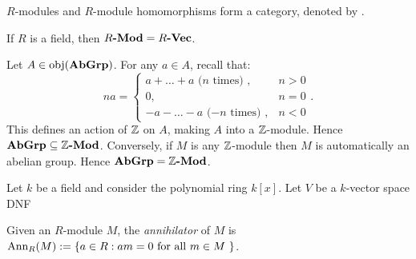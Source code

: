 \begin{definition}
	$R$-modules and $R$-module homomorphisms form a category, denoted by \emph{}.
\end{definition}

\begin{example}
	If $R$ is a field, then ${\normalfont\textbf{$R$-Mod}} = {\normalfont\textbf{$R$-Vec}}$.
\end{example}

\begin{example}
	Let $A \in \operatorname{obj}({\normalfont\textbf{AbGrp}})$. For any $a \in A$, recall that:
	\[
		na = \begin{cases} a + \ldots + a \text{ ($n$ times) }, & n > 0 \\ 0, & n =0 \\ -a - \ldots - a \text{ ($-n$ times) }, & n < 0\end{cases}.
	\]
	This defines an action of $\mathbb{Z}$ on $A$, making $A$ into a $\mathbb{Z}$-module. Hence ${\normalfont\textbf{AbGrp}} \subseteq {\normalfont\textbf{$\mathbb{Z}$-Mod}}$. Conversely, if $M$ is any $\mathbb{Z}$-module then $M$ is automatically an abelian group. Hence ${\normalfont\textbf{AbGrp}} = {\normalfont\textbf{$\mathbb{Z}$-Mod}}$.
\end{example}

\begin{example}
	Let $k$ be a field and consider the polynomial ring $k[x]$. Let $V$ be a $k$-vector space {\color{red} DNF}
\end{example}

\begin{definition}
	Given an $R$-module $M$, the \emph{annihilator} of $M$ is $\operatorname{Ann}_R(M) := \{a \in R : am= 0 \text{ for all $m \in M$ }\}$.
\end{definition}

